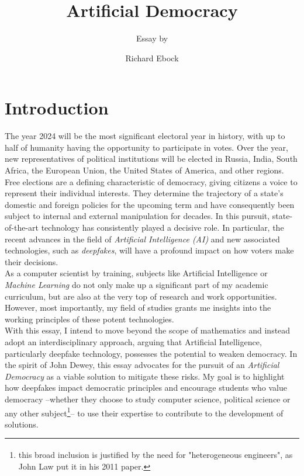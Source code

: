 \documentclass[wide]{adonis}
\title{Artificial Democracy}
\subtitle{Essay by}
\author{Richard Ebock}
\begin{document}
	\maketitle	
        
	\section{Introduction}
            The year 2024 will be the most significant electoral year in history, with up to half of humanity having the opportunity to participate in votes. Over the year, new representatives of political institutions will be elected in Russia, India, South Africa, the European Union, the United States of America, and other regions.\\
            Free elections are a defining characteristic of democracy, giving citizens a voice to represent their individual interests. They determine the trajectory of a state's domestic and foreign policies for the upcoming term and have consequently been subject to internal and external manipulation for decades. In this pursuit, state-of-the-art technology has consistently played a decisive role. In particular, the recent advances in the field of \textit{Artificial Intelligence (AI)} and new associated technologies, such as \textit{deepfakes}, will have a profound impact on how voters make their decisions. \\
            As a computer scientist by training, subjects like Artificial Intelligence or \textit{Machine Learning} do not only make up a significant part of my academic curriculum, but are also at the very top of research and work opportunities. However, most importantly, my field of studies grants me insights into the working principles of these potent technologies.\\
            With this essay, I intend to move beyond the scope of mathematics and instead adopt an interdisciplinary approach, arguing that Artificial Intelligence, particularly deepfake technology, possesses the potential to weaken democracy. In the spirit of John Dewey, this essay advocates for the pursuit of an \textit{Artificial Democracy} as a viable solution to mitigate these risks.
            My goal is to highlight how deepfakes impact democratic principles and encourage students who value democracy --whether they choose to study computer science, political science or any other subject\footnote{this broad inclusion is justified by the need for "heterogeneous engineers"\textsuperscript{\cite{law2011}}, as John Law put it in his 2011 paper.}-- to use their expertise to contribute to the development of solutions.
\end{document}
